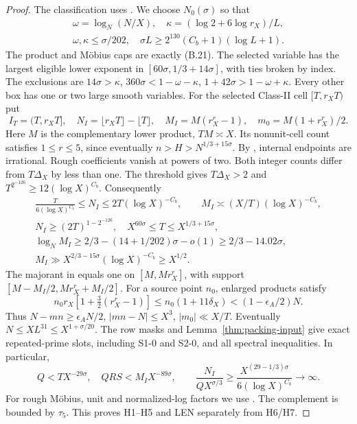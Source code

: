 \begin{proof}
The classification uses \cite[(B.20)--(B.24), (B.27)--(B.28), (B.30)]{Z1}.
We choose $N_0(\sigma)$ so that
\[
 \begin{gathered}
 \omega=\log_N(N/X),\quad\kappa=(\log2+6\log r_X)/L,\\
 \omega,\kappa\le\sigma/202,\quad
 \sigma L\ge2^{130}(C_b+1)(\log L+1).
\end{gathered}
\]
The product and M\"obius caps are exactly (B.21).
The selected variable has the largest eligible lower exponent in $[60\sigma,1/3+14\sigma]$,
with ties broken by index.
The exclusions are $14\sigma>\kappa$, $360\sigma<1-\omega-\kappa$,
$1+42\sigma>1-\omega+\kappa$.
Every other box has one or two large smooth variables.
For the selected Class-II cell $[T,r_XT)$ put
\[
 I_T=(T,r_XT],\quad N_I=\lfloor r_XT\rfloor-\lfloor T\rfloor,\quad
 M_I=M(r_X^r-1),\quad m_0=M(1+r_X^r)/2.
\]
Here $M$ is the complementary lower product, $TM\asymp X$.
Its nonunit-cell count satisfies $1\le r\le5$,
since eventually $n>H>N^{1/3+15\sigma}$.
By \cite[Lemma~B.3, (B.22)--(B.24)]{Z1}, internal endpoints are irrational.
Rough coefficients vanish at powers of two.
Both integer counts differ from $T\Delta_X$ by less than one.
The threshold gives $T\Delta_X>2$ and $T^{2^{-126}}\ge12(\log X)^{C_b}$.
Consequently
\[
\begin{gathered}
 \frac{T}{6(\log X)^{C_b}}\le N_I\le2T(\log X)^{-C_b},\qquad
 M_I\asymp(X/T)(\log X)^{-C_b},\\
 N_I\ge(2T)^{1-2^{-126}},\quad X^{60\sigma}\le T\le X^{1/3+15\sigma},\\
 \log_NM_I\ge2/3-(14+1/202)\sigma-o(1)\ge2/3-14.02\sigma,\\
 M_I\gg X^{2/3-15\sigma}(\log X)^{-C_b}\ge X^{1/2}.
\end{gathered}
\]
The majorant in \cite[Appendix~B, immediately before (B.27)]{Z1}
equals one on $[M,Mr_X^r]$,
with support $[M-M_I/2,Mr_X^r+M_I/2]$.
For a source point $n_0$, enlarged products satisfy
\[
 n_0r_X[1+\tfrac32(r_X^r-1)]\le n_0(1+11\delta_X)<(1-\epsilon_A/2)N.
\]
Thus $N-mn\ge\epsilon_A N/2$, $|mn-N|\le X^3$, $|m_0|\ll X/T$.
Eventually $N\le XL^{31}\le X^{1+\sigma/20}$.
The row masks and Lemma~\ref{thm:packing-input} give exact repeated-prime slots,
including S1-0 and S2-0, and all spectral inequalities.
In particular,
\[
 Q<TX^{-29\sigma},\quad QRS<M_IX^{-89\sigma},\qquad
 \frac{N_I}{QX^{\sigma/3}}\ge
 \frac{X^{(29-1/3)\sigma}}{6(\log X)^{C_b}}\longrightarrow\infty.
\]
For rough M\"obius, unit and normalized-log factors
we use \cite[(3.25), (3.47)--(3.48)]{Z1}.
The complement is bounded by $\tau_5$.
This proves H1--H5 and LEN separately from H6/H7.


\end{proof}
